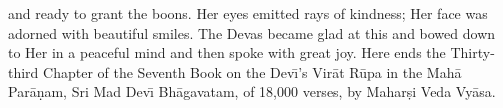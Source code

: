 and ready to grant the boons. Her eyes emitted rays of kindness; Her face was adorned with beautiful smiles. The Devas became glad at this and bowed down to Her in a peaceful mind and then spoke with great joy.
Here ends the Thirty-third Chapter of the Seventh Book on the Dev\={\i}'s Vir\=at R\=upa in the Mah\=a Par\=a\d{n}am, Sri Mad Dev\={\i} Bh\=agavatam, of 18,000 verses, by Mahar\d{s}i Veda Vy\=asa.



